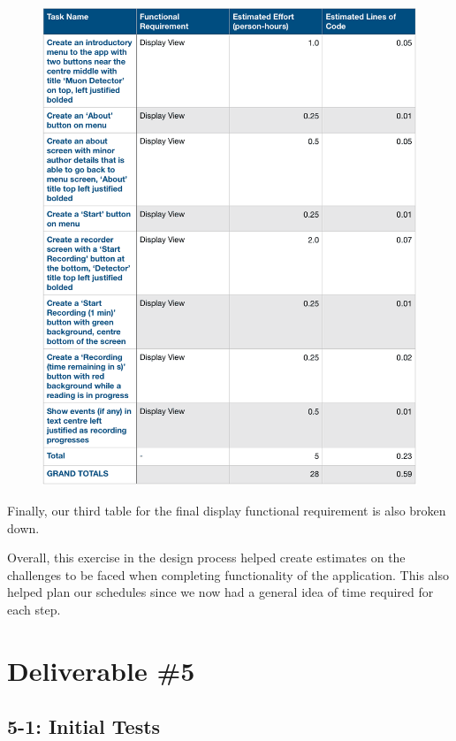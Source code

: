 \documentclass[11pt,a4paper]{article}
\begin{document}
\newpage
\begin{figure}[h]
  \centering
      \includegraphics[width=1.0\textwidth]{displaytable4.png}  
\end{figure}

Finally, our third table for the final display functional requirement is also broken down. 

Overall, this exercise in the design process helped create estimates on the challenges to be faced when completing functionality of the application. This also helped plan our schedules since we now had a general idea of time required for each step. 



\newpage
\section*{Deliverable \#5}

\subsection*{5-1: Initial Tests}
\end{document}
